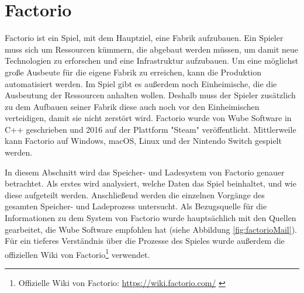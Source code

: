 \section{Factorio}\label{sec:factorio}
Factorio ist ein Spiel, mit dem Hauptziel, eine Fabrik aufzubauen. Ein Spieler muss sich um Ressourcen kümmern, die abgebaut werden müssen, um damit neue Technologien zu erforschen und eine Infrastruktur aufzubauen. Um eine möglichst große Ausbeute für die eigene Fabrik zu erreichen, kann die Produktion automatisiert werden. Im Spiel gibt es außerdem noch Einheimische, die die Ausbeutung der Ressourcen anhalten wollen. Deshalb muss der Spieler zusätzlich zu dem Aufbauen seiner Fabrik diese auch noch vor den Einheimischen verteidigen, damit sie nicht zerstört wird. Factorio wurde von Wube Software in C++ geschrieben und 2016 auf der Plattform "Steam" veröffentlicht. Mittlerweile kann Factorio auf Windows, macOS, Linux und der Nintendo Switch gespielt werden.\cite{factorioMain}\cite{factorioPressFactorio}

In diesem Abschnitt wird das Speicher- und Ladesystem von Factorio genauer betrachtet. Als erstes wird analysiert, welche Daten das Spiel beinhaltet, und wie diese aufgeteilt werden. Anschließend werden die einzelnen Vorgänge des gesamten Speicher- und Ladeprozess untersucht. Als Bezugsquelle für die Informationen zu dem System von Factorio wurde hauptsächlich mit den Quellen gearbeitet, die Wube Software empfohlen hat (siehe Abbildung \ref{fig:factorioMail}). Für ein tieferes Verständnis über die Prozesse des Spieles wurde außerdem die offiziellen Wiki von Factorio\footnote{Offizielle Wiki von Factorio: \url{https://wiki.factorio.com/} \cite{factorioPressFactorio}} verwendet.

